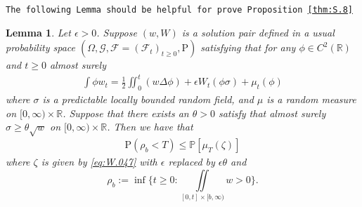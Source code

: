 \documentclass[12pt,a4paper]{amsart}
\numberwithin{equation}{section}
\theoremstyle{plain}
\newtheorem{lemma}[theorem]{Lemma}
\theoremstyle{remark}
\begin{document}
{\tt The following Lemma should be helpful for prove Proposition \ref{thm:S.8}}
\begin{lemma}
	Let $\epsilon > 0$.
	Suppose $(w,W)$ is a solution pair defined in a usual probability space $(\Omega, \mathcal G,\mathcal F = (\mathcal F_t)_{t\geq 0}, \mathrm P) $ satisfying that for any $\phi\in C^2(\mathbb R)$ and $t\geq 0$ almost surely
	\begin{equation}\label{eq:W.048}\begin{multlined}
	\int \phi w_t
	= \frac{1}{2}\iint_0^t (w\Delta \phi) + \epsilon W_t(\phi\sigma) + \mu_t(\phi )
	\end{multlined}\end{equation}
	where $\sigma$ is a predictable locally bounded random field, and $\mu$ is a random measure on $[0,\infty) \times\mathbb R$.
	Suppose that there exists an $\theta > 0$ satisfy that almost surely $\sigma \geq \theta \sqrt{w}$ on $[0,\infty) \times \mathbb R$.
	Then we have that
\begin{align}
	\mathrm P( \rho_b < T) \leq \mathbb P [\mu_T(\zeta) ]
\end{align}
	where $\zeta$ is given by  \eqref{eq:W.047} with $\epsilon$ replaced by $\epsilon \theta$ and 
	\[\rho_b := \inf\Big\{t\geq 0: \iint\limits_{[0,t]\times [b, \infty)}  w > 0\Big\}.\]
\end{lemma}
\end{document}
